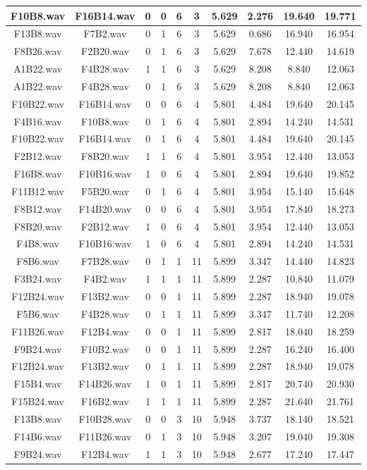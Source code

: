 \documentclass[11pt,a4paper]{book}
\begin{document}
\begin{longtable}[c]{|c|c|c|c|c|c|c|c|c|c|}
F10B8.wav&F16B14.wav&0&0&6&3&5.629&2.276&19.640&19.771\\ \hline
F13B8.wav&F7B2.wav&0&1&6&3&5.629&0.686&16.940&16.954\\ \hline
F8B26.wav&F2B20.wav&0&1&6&3&5.629&7.678&12.440&14.619\\ \hline
A1B22.wav&F4B28.wav&1&1&6&3&5.629&8.208&8.840&12.063\\ \hline
A1B22.wav&F4B28.wav&0&1&6&3&5.629&8.208&8.840&12.063\\ \hline
F10B22.wav&F16B14.wav&0&0&6&4&5.801&4.484&19.640&20.145\\ \hline
F4B16.wav&F10B8.wav&0&1&6&4&5.801&2.894&14.240&14.531\\ \hline
F10B22.wav&F16B14.wav&0&1&6&4&5.801&4.484&19.640&20.145\\ \hline
F2B12.wav&F8B20.wav&1&1&6&4&5.801&3.954&12.440&13.053\\ \hline
F16B8.wav&F10B16.wav&1&0&6&4&5.801&2.894&19.640&19.852\\ \hline
F11B12.wav&F5B20.wav&0&1&6&4&5.801&3.954&15.140&15.648\\ \hline
F8B12.wav&F14B20.wav&0&0&6&4&5.801&3.954&17.840&18.273\\ \hline
F8B20.wav&F2B12.wav&1&0&6&4&5.801&3.954&12.440&13.053\\ \hline
F4B8.wav&F10B16.wav&1&0&6&4&5.801&2.894&14.240&14.531\\ \hline
F8B6.wav&F7B28.wav&0&1&1&11&5.899&3.347&14.440&14.823\\ \hline
F3B24.wav&F4B2.wav&1&1&1&11&5.899&2.287&10.840&11.079\\ \hline
F12B24.wav&F13B2.wav&0&0&1&11&5.899&2.287&18.940&19.078\\ \hline
F5B6.wav&F4B28.wav&0&1&1&11&5.899&3.347&11.740&12.208\\ \hline
F11B26.wav&F12B4.wav&0&0&1&11&5.899&2.817&18.040&18.259\\ \hline
F9B24.wav&F10B2.wav&0&0&1&11&5.899&2.287&16.240&16.400\\ \hline
F12B24.wav&F13B2.wav&0&1&1&11&5.899&2.287&18.940&19.078\\ \hline
F15B4.wav&F14B26.wav&1&0&1&11&5.899&2.817&20.740&20.930\\ \hline
F15B24.wav&F16B2.wav&1&1&1&11&5.899&2.287&21.640&21.761\\ \hline
F13B8.wav&F10B28.wav&0&0&3&10&5.948&3.737&18.140&18.521\\ \hline
F14B6.wav&F11B26.wav&0&1&3&10&5.948&3.207&19.040&19.308\\ \hline
F9B24.wav&F12B4.wav&1&1&3&10&5.948&2.677&17.240&17.447\\ \hline

\end{longtable}
\end{document}
